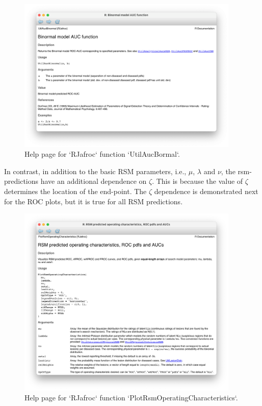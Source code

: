 \documentclass[
]{book}
\begin{document}
\begin{figure}

{\centering \includegraphics[width=300pt]{images/rsm-predictions/util-aucs-binormal} 

}

\caption{Help page for `RJafroc` function `UtilAucBormal`.}\label{fig:rsm-predictions-binorml-help}
\end{figure}

In contrast, in addition to the basic RSM parameters, i.e., \(\mu\), \(\lambda\) and \(\nu\), the rsm-predictions have an additional dependence on \(\zeta\). This is because the value of \(\zeta\) determines the location of the end-point. The \(\zeta\) dependence is demonstrated next for the ROC plots, but it is true for all RSM predictions.

\begin{figure}

{\centering \includegraphics[width=300pt]{images/rsm-predictions/PlotRsmOperatingCharacteristics} 

}

\caption{Help page for `RJafroc` function `PlotRsmOperatingCharacteristics`.}\label{fig:rsm-predictions-operating-characteristics-help}
\end{figure}
\end{document}
